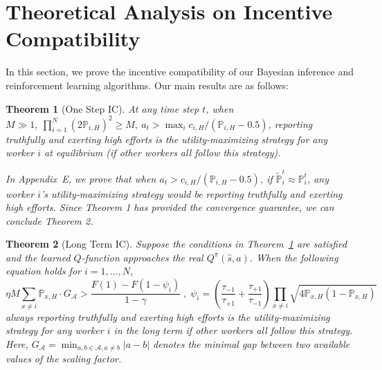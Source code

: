 \documentclass{article}
\makeatletter
\newtheorem{theorem}{Theorem}
\renewenvironment{proof}[1][\proofname]{\par
  \vspace{-\topsep}%
  \pushQED{\qed}%
  \normalfont
  \topsep0pt \partopsep0pt %
  \trivlist
  \item[\hskip\labelsep
        \itshape
    #1\@addpunct{.}]\ignorespaces
}{%
  \popQED\endtrivlist\@endpefalse
  \addvspace{0pt plus 0pt} %
}
\newcommand{\com}[1]{\textbf{\color{red}(COMMENT: #1)}} %
\newcommand{\com}[1]{}
\makeatother
\begin{document}
\section{Theoretical Analysis on Incentive Compatibility}
\label{analysis}
In this section, we prove the incentive compatibility of our Bayesian inference and reinforcement learning algorithms. Our main results are as follows:
\begin{theorem}[One Step IC]
\label{OSEqulibrium}
At any time step $t$, when 
$M\gg 1,~{\prod}_{i=1}^{N}(2\mathbb{P}_{i,H})^{2} \geq M,~a_t>\max_{i}c_{i,H}/(\mathbb{P}_{i,H}-0.5)$, 
reporting truthfully and exerting high efforts is the utility-maximizing strategy for any worker $i$ at equilibrium (if other workers all follow this strategy).
\begin{proof}
In Appendix~E, we prove that when $a_t>c_{i,H}/(\mathbb{P}_{i,H}-0.5)$, if $\tilde{\mathbb{P}}^t_i\approx \mathbb{P}^t_i$, any worker $i$'s utility-maximizing strategy would be reporting truthfully and exerting high efforts.
Since Theorem 1 has provided the convergence guarantee, we can conclude Theorem 2.
\end{proof}
\end{theorem}
\begin{theorem}[Long Term IC]
\label{RMNE}
Suppose the conditions in Theorem~\ref{OSEqulibrium} are satisfied and the learned $Q$-function approaches the real $Q^{\pi}(\hat{s},a)$. When the following equation holds for $i=1,\ldots, N$,
\begin{equation}
\label{Condition}
\eta M\sum_{x\neq i} \mathbb{P}_{x,H} \cdot G_{\mathcal{A}}> \frac{F(1)-F(1-\psi_{i})}{1-\gamma}
\;,\; \psi_i =\left(\frac{\tau_{-1}}{\tau_{+1}}+\frac{\tau_{+1}}{\tau_{-1}}\right)\prod_{x\neq i}\sqrt{4\mathbb{P}_{x,H}(1-\mathbb{P}_{x,H})}
\end{equation}
always reporting truthfully and exerting high efforts is the utility-maximizing strategy for any worker $i$ in the long term if other workers all follow this strategy. Here, $G_{\mathcal{A}}=\min_{a,b\in\mathcal{A}, a\neq b}|a-b|$ denotes the minimal gap between two available values of the scaling factor.
\end{theorem}
\end{document}
